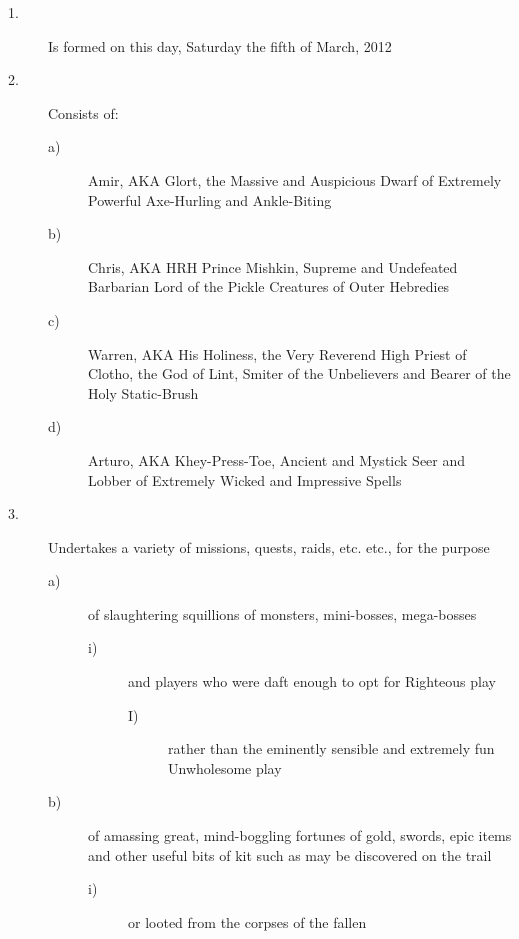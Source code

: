 \begin{description}
\item[1.] Is formed on this day, Saturday the fifth of March, 2012

\item[2.] Consists of:

\begin{description}
\item[a)] Amir, AKA Glort, the Massive and 
Auspicious Dwarf of Extremely Powerful Axe-Hurling and Ankle-Biting 


\item[b)] Chris, AKA HRH Prince Mishkin, Supreme 
and Undefeated Barbarian Lord of the Pickle Creatures of Outer 
Hebredies 

\item[c)] Warren, AKA His Holiness, the Very 
Reverend High Priest of Clotho, the God of Lint, Smiter of the 
Unbelievers and Bearer of the Holy Static-Brush 

\item[d)] Arturo, AKA Khey-Press-Toe, Ancient and 
Mystick Seer and Lobber of Extremely Wicked and Impressive Spells 

\end{description}

\item[3.] Undertakes a variety of missions, quests, raids, etc. etc., for the 
purpose

\begin{description}
\item[a)] of slaughtering squillions of monsters, 
mini-bosses, mega-bosses 

\begin{description}
\item[i)] and players who were daft enough to opt 
for Righteous play 

\begin{description}
\item[I)] rather than the eminently sensible and 
extremely fun Unwholesome play 
\end{description}
\end{description}

\item[b)] of amassing great, mind-boggling 
fortunes of gold, swords, epic items and other useful bits of kit such 
as may be discovered on the trail 

\begin{description}
\item[i)] or looted from the corpses of the 
fallen 
\end{description}
\end{description}


\end{description}
